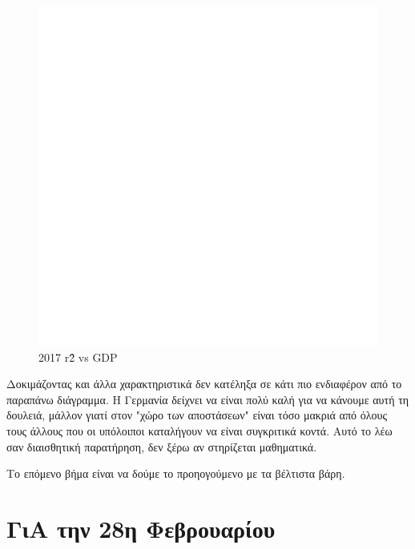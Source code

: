\documentclass[a4paper,twoside,10pt]{article}
\begin{document}
	\begin{figure}[H]
		\centering
		\includegraphics[width = \textwidth]{images/2017 r^2 vs GDP.png}
		\caption{2017 r\^2 vs GDP}
		\label{fig:/2017 r^2 vs_GDP}
	\end{figure}
	
	Δοκιμάζοντας και άλλα χαρακτηριστικά δεν κατέληξα σε κάτι πιο ενδιαφέρον από το παραπάνω διάγραμμα. Η Γερμανία δείχνει να είναι πολύ καλή για να κάνουμε αυτή τη δουλειά, μάλλον γιατί στον "χώρο των αποστάσεων" είναι τόσο μακριά από όλους τους άλλους που οι υπόλοιποι καταλήγουν να είναι συγκριτικά κοντά. Αυτό το λέω σαν διαισθητική παρατήρηση, δεν ξέρω αν στηρίζεται μαθηματικά. 
	
	Το επόμενο βήμα είναι να δούμε το προηογούμενο με τα βέλτιστα βάρη. 
	
	\section{ΓιΑ την 28η Φεβρουαρίου}
	
\end{document}

